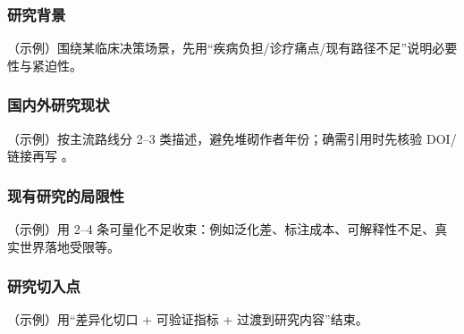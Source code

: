
\subsubsection{研究背景}
\justifying\indent
（示例）围绕某临床决策场景，先用“疾病负担/诊疗痛点/现有路径不足”说明必要性与紧迫性。

\subsubsection{国内外研究现状}
\indent
（示例）按主流路线分 2–3 类描述，避免堆砌作者年份；确需引用时先核验 DOI/链接再写 \cite{...}。

\subsubsection{现有研究的局限性}
\indent
（示例）用 2–4 条可量化不足收束：例如泛化差、标注成本、可解释性不足、真实世界落地受限等。

\subsubsection{研究切入点}
\indent
（示例）用“差异化切口 + 可验证指标 + 过渡到研究内容”结束。

